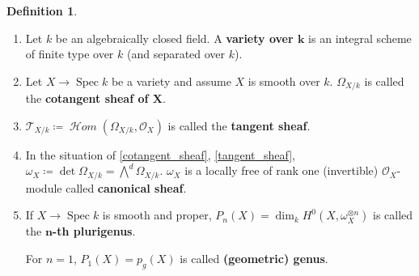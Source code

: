 \documentclass[12pt]{article}
\DeclareMathOperator{\Spec}{Spec}
\DeclareMathOperator{\shHom}{\mathcal{H}\textit{om}}
\theoremstyle{definition}
\newtheorem*{definition}{Definition}
\theoremstyle{remark}
\newtheorem*{comment}{Comment}
\begin{document}
\begin{comment}
There exists another construction of the sheaf of differentials. For that, take the diagonal $\Delta:X\rightarrow X\times_YX$ and a sheaf of ideals $\mathcal{I}_{\Delta}\subseteq\mathcal{O}_{X\times_YX}$. The sheaf of differentials is the $\mathcal{O}_X$-module $\Delta^*(\mathcal{I}/\mathcal{I}^2)$. For further details, see Hartshorne \cite{hartshorne2013algebraic}.

In analysis, if the Jacobian matrix has maximum rank, $d$ variables can be written in terms of the other variables. In algebra, this cannot be done. The solution equations don't need to be polynomials, but, at least on the complex numbers, they are power series (Hensel's lemma). The problem is that most of power series aren't algebraic over the ring of polynomials. But there exists a ring in between that extends polynomials and is algebraic.
\[
\begin{tikzcd}
R=k[x_1,\ldots,x_n]\arrow[rr,hook]\arrow[rd]&&\hat{R}=k[|x_1,\ldots,x_n|]\\
&R^h\arrow[ru]
\end{tikzcd}
\]
$R^h$ is called the <<henselization>> of $R$.
\end{comment}

\begin{definition}
\begin{enumerate}[label=\arabic*)]
\item Let $k$ be an algebraically closed field. A \textbf{variety over $\boldsymbol{k}$} is an integral scheme of finite type over $k$ (and separated over $k$).

\item\label{cotangent_sheaf} Let $X\rightarrow\Spec k$ be a variety and assume $X$ is smooth over $k$. $\Omega_{X/k}$ is called the \textbf{cotangent sheaf of $\boldsymbol{X}$}.

\item\label{tangent_sheaf} $\mathcal{T}_{X/k}\coloneqq\shHom(\Omega_{X/k},\mathcal{O}_X)$ is called the \textbf{tangent sheaf}.

\item In the situation of \ref{cotangent_sheaf}, \ref{tangent_sheaf}, $\omega_X\coloneqq\det\Omega_{X/k}={\bigwedge}^d\Omega_{X/k}$. $\omega_X$ is a locally free of rank one (invertible) $\mathcal{O}_X$-module called \textbf{canonical sheaf}.

\item If $X\rightarrow\Spec k$ is smooth and proper, $P_n(X)=\dim_kH^0(X,\omega_X^{\otimes n})$ is called the \textbf{$\boldsymbol{n}$-th plurigenus}.

For $n=1$, $P_1(X)=p_g(X)$ is called \textbf{(geometric) genus}.
\end{enumerate}
\end{definition}
\end{document}
